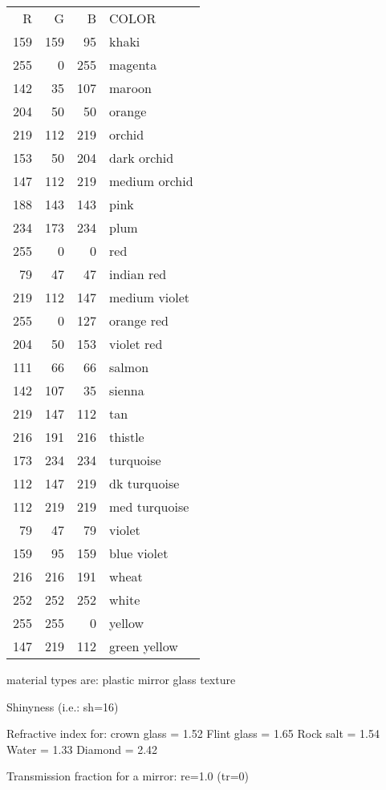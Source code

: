 \begin{tabular}{r r r l}
R & G & B &         COLOR \\
159 & 159 & 95 & khaki  \\
255 & 0 & 255 & magenta \\
142 & 35 & 107 & maroon \\
204 & 50 & 50 & orange \\
219 & 112 & 219 & orchid \\
153 & 50 & 204 & dark orchid \\
147 & 112 & 219 & medium orchid \\
188 & 143 & 143 & pink \\
234 & 173 & 234 & plum \\
255 & 0 & 0 & red \\
79 & 47 & 47 & indian red \\
219 & 112 & 147 & medium violet \\
255 & 0 & 127 & orange red \\
204 & 50 & 153 & violet red \\
111 & 66 & 66 & salmon \\
142 & 107 & 35 & sienna \\
219 & 147 & 112 & tan \\
216 & 191 & 216 & thistle \\
173 & 234 & 234 & turquoise \\
112 & 147 & 219 & dk turquoise \\
112 & 219 & 219 & med turquoise \\
79 & 47 & 79 & violet \\
159 & 95 & 159 & blue violet \\
216 & 216 & 191 & wheat \\
252 & 252 & 252 & white \\
255 & 255 & 0 & yellow \\
147 & 219 & 112 & green yellow
\end{tabular}

material types are:  plastic
                               mirror
                               glass
                               texture

Shinyness (i.e.:  sh=16)

Refractive index for:  crown glass = 1.52
                              Flint glass = 1.65
                              Rock salt = 1.54
                              Water = 1.33
                              Diamond = 2.42

Transmission fraction for a mirror:  re=1.0 (tr=0)

